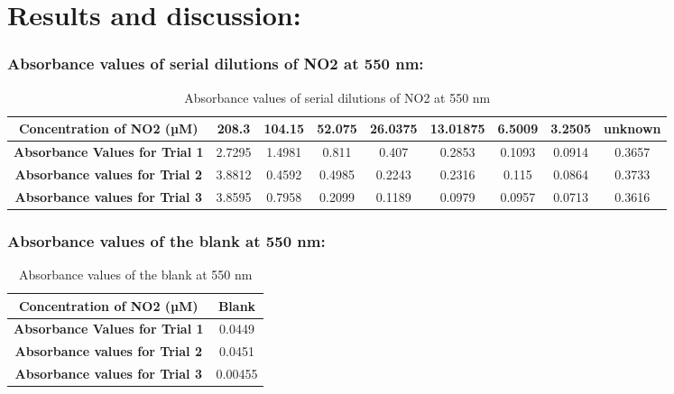 \documentclass{report}
\begin{document}
\vspace{1cm}

\section*{Results and discussion:}   

\subsubsection*{Absorbance values of serial dilutions of NO2 at 550 nm:}
   \begin{table}[ht]
    \centering
    \caption{Absorbance values of serial dilutions of NO2 at 550 nm}
    \vspace{0.5cm}
    \label{tab:table1}

    \begin{tabular}{|c|c|c|c|c|c|c|c|c|}
      \hline
      \textbf{Concentration of NO2 (µM)} & 208.3 & 104.15 & 52.075 & 26.0375 & 13.01875 & 6.5009 & 3.2505 & \textbf{unknown} \\
      \hline
      \textbf{Absorbance Values for Trial 1} & 2.7295 & 1.4981 & 0.811 & 0.407 & 0.2853 & 0.1093 & 0.0914 & 0.3657  \\
      \hline
      \textbf{Absorbance values for Trial 2} & 3.8812 & 0.4592  & 0.4985 & 0.2243 & 0.2316 & 0.115 & 0.0864 & 0.3733 \\
      \hline
      \textbf{Absorbance values for Trial 3} & 3.8595 & 0.7958 & 0.2099 & 0.1189 & 0.0979 & 0.0957 & 0.0713 & 0.3616 \\
      \hline
    \end{tabular}
  
   \end{table}
\subsubsection*{Absorbance values of the blank at 550 nm:}    
   \begin{table}[ht]
     \centering
      \caption{Absorbance values of the blank at 550 nm}
      \vspace{0.5cm}
      \label{tab:table2}
      
      \begin{tabular}{|c|c|}
        \hline
        \textbf{Concentration of NO2 (µM)} & \textbf{Blank} \\
        \hline
        \textbf{Absorbance Values for Trial 1} & 0.0449  \\
        \hline
        \textbf{Absorbance values for Trial 2} & 0.0451  \\
        \hline
        \textbf{Absorbance values for Trial 3} & 0.00455 \\
        \hline
      \end{tabular}
    \end{table}
\end{document}

